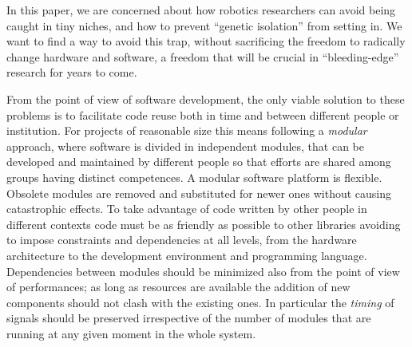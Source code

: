 





%

In this paper, we are concerned
about how robotics researchers can avoid being caught in tiny
niches, and how to prevent ``genetic isolation'' from setting in.
We want to find a way to avoid this trap, without sacrificing
the freedom to radically change hardware and software, a freedom 
that will be crucial in ``bleeding-edge'' research for years to 
come.

From the point of view of software development, the only viable 
solution to these problems is to facilitate 
code reuse both in time and between different people or 
institution. For projects of reasonable size this means following
a \emph{modular} approach, where software is divided in 
independent modules, that can be developed and maintained 
by different people so that efforts 
are shared among groups having distinct competences. A 
modular software platform is flexible. Obsolete modules are 
removed and substituted for newer ones without causing 
catastrophic effects. To take advantage of code written by 
other people in different contexts code must be as friendly 
as possible to other libraries avoiding to impose constraints 
and dependencies at all levels, from the hardware architecture 
to the development environment and programming language. 
Dependencies between modules should be 
minimized also from the point of view of performances; as 
long as resources are available the addition of new 
components should not clash with the existing ones. In 
particular the \emph{timing} of signals should be preserved 
irrespective of the number of modules that are running 
at any given moment in the whole system. 

